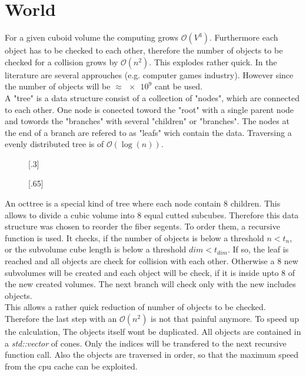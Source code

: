 \section{World}
For a given cuboid volume the computing grows $\mathcal{O}(V^3)$.
Furthermore each object has to be checked to each other, therefore the number of objects to be checked for a collision grows by $\mathcal{O}(n^2)$.
This explodes rather quick.
In the literature are several approuches (e.g. computer games industry).
However since the number of objects will be $\approx \num{e9}$ \dummy cant be used. \\
% 
A "tree" is a data structure consist of a collection of "nodes", which are connected to each other.
One node is conected toword the "root" with a single parent node and towords the "branches" with several "children" or "branches".
The nodes at the end of a branch are refered to as "leafs" wich contain the data.
Traversing a  evenly distributed tree is of $\mathcal{O}(\log(n))$.\\
% 
\begin{figure}[!tb]
    \centering
    [.3\textwidth]{
    \def\tikzheight{0.6\textwidth}
    
    }
    [.65\textwidth]{
    \def\tikzheight{0.6\textwidth}
    
    }
	\caption{}
	\label{fig:oct_tree}
\end{figure}
% 
An octtree is a special kind of tree where each node contain 8 children.
This allows to divide a cubic volume into 8 equal cutted subcubes.
Therefore this data structure was chosen to reorder the fiber segents.
To order them, a recursive function is used.
It checks, if the number of objects is below a threshold $n < t_n$, or the subvolume cube length is below a threshold $dim < t_{dim}$.
If so, the leaf is reached and all objects are check for collision with each other.
Otherwise a 8 new subvolumes will be created and each object will be check, if it is inside upto 8 of the new created volumes.
The next branch will check only with the new includes objects. \\
% 
This allows a rather quick reduction of number of objects to be checked.
Therefore the last step with an $\mathcal{O}(n^2)$ is not that painful anymore.
To speed up the calculation, The objects itself wont be duplicated.
All objects are contained in a \textit{std::vector} of cones.
Only the indices will be transfered to the next recursive function call.
Also the objects are traversed in order, so that the maximum speed from the cpu cache can be exploited. \\
